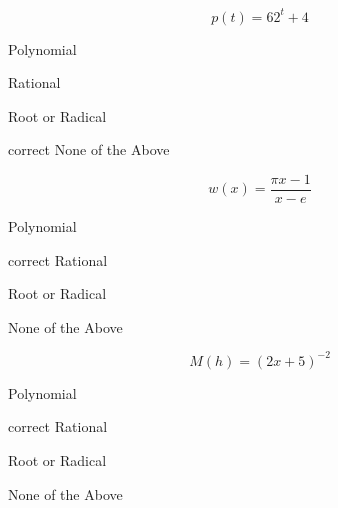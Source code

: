 \documentclass{ximera}
\begin{document}
\begin{exercise}
\begin{question}
\end{question}









\begin{question}


\[
p(t) = 6 2^t + 4
\]

\begin{multipleChoice}
\item {Polynomial}
\item {Rational}
\item {Root or Radical}
\item [correct]{None of the Above}
\end{multipleChoice}


\end{question}












\begin{question}


\[
w(x) = \frac{\pi x - 1}{x - e}
\]

\begin{multipleChoice}
\item {Polynomial}
\item [correct]{Rational}
\item {Root or Radical}
\item {None of the Above}
\end{multipleChoice}


\end{question}











\begin{question}


\[
M(h) = (2x+5)^{-2}
\]

\begin{multipleChoice}
\item {Polynomial}
\item [correct]{Rational}
\item {Root or Radical}
\item {None of the Above}
\end{multipleChoice}


\end{question}











\end{exercise}
\end{document}
